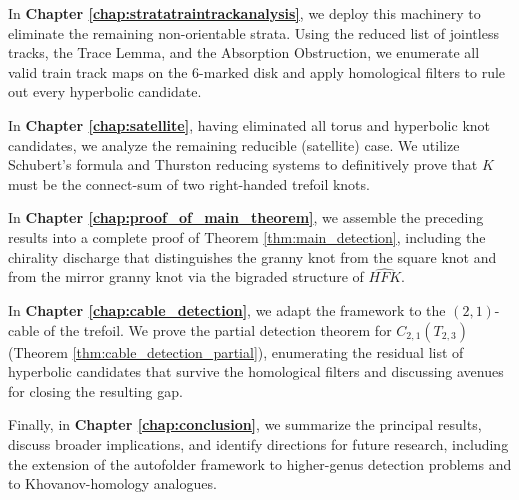 In \textbf{Chapter \ref{chap:stratatraintrackanalysis}}, we deploy this machinery to eliminate the remaining non-orientable strata. Using the reduced list of jointless tracks, the Trace Lemma, and the Absorption Obstruction, we enumerate all valid train track maps on the 6-marked disk and apply homological filters to rule out every hyperbolic candidate. 

In \textbf{Chapter \ref{chap:satellite}}, having eliminated all torus and hyperbolic knot candidates, we analyze the remaining reducible (satellite) case. We utilize Schubert's formula and Thurston reducing systems to definitively prove that $K$ must be the connect-sum of two right-handed trefoil knots.

In \textbf{Chapter \ref{chap:proof_of_main_theorem}}, we assemble the preceding results into a complete proof of Theorem \ref{thm:main_detection}, including the chirality discharge that distinguishes the granny knot from the square knot and from the mirror granny knot via the bigraded structure of $\widehat{HFK}$.

In \textbf{Chapter \ref{chap:cable_detection}}, we adapt the framework to the $(2,1)$-cable of the trefoil. We prove the partial detection theorem for $C_{2,1}(T_{2,3})$ (Theorem \ref{thm:cable_detection_partial}), enumerating the residual list of hyperbolic candidates that survive the homological filters and discussing avenues for closing the resulting gap.

Finally, in \textbf{Chapter \ref{chap:conclusion}}, we summarize the principal results, discuss broader implications, and identify directions for future research, including the extension of the autofolder framework to higher-genus detection problems and to Khovanov-homology analogues.
